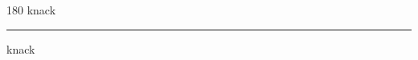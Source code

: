 
\begin{frame}
\begin{center}
\begin{turn}{180}
{\fontsize{2.5cm}{1em}\selectfont knack}
\end{turn}
\vspace{1em}\par  
\hrule
\vspace{1em}\par  
{\fontsize{2.5cm}{1em}\selectfont knack}
\end{center}
\end{frame}

